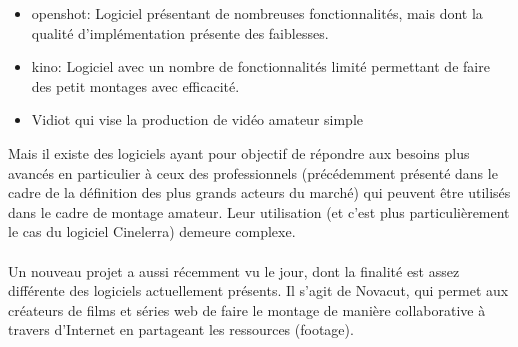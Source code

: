 \begin {itemize}

  \item {openshot: Logiciel présentant  de nombreuses fonctionnalités,
  mais dont la
    qualité d'implémentation présente des faiblesses.}

  \item {kino: Logiciel avec un nombre de fonctionnalités limité
  permettant de faire des petit montages avec efficacité.}

  \item {Vidiot qui vise la production de vidéo amateur simple}

\end {itemize}

Mais il existe des logiciels ayant pour objectif de répondre aux besoins
plus avancés en particulier à ceux des professionnels (précédemment
présenté dans le cadre de la définition des plus grands acteurs du
marché) qui peuvent être utilisés dans le cadre de montage amateur.
Leur utilisation (et c'est plus particulièrement le cas du logiciel
Cinelerra) demeure complexe.

\paragraph{}

Un nouveau projet a aussi récemment vu le jour, dont la finalité est
assez différente des logiciels actuellement présents. Il s'agit de
Novacut, qui permet aux créateurs de films et séries web de faire le
montage de manière collaborative à travers d'Internet en partageant
les ressources (footage).

\paragraph{}







